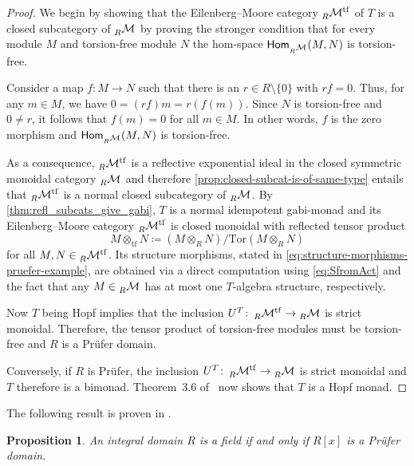 \documentclass[12pt,dvipsnames,oneside]{amsart}
\theoremstyle{plain}
\newtheorem{proposition}{Proposition}[section]
\theoremstyle{remark}
\theoremstyle{definition}
\newcommand*{\from}{\colon}
\newcommand*{\eqdef}{\coloneqq}
\newcommand{\Tor}{\ensuremath{\mathrm{Tor}}}
\newcommand*{\Hom}{\mathsf{Hom}}
\newcommand{\U}{U}
\begin{document}
\begin{proof}
  We begin by showing that the Eilenberg--Moore category \(\hmodM[R][][ \mathrm{tf}]\) of \(T\) is a closed subcategory of \(\hmodM[R]\) by proving the stronger condition that for every module \(M\) and torsion-free module \(N\) the hom-space \(\Hom_{\hmodM[R]}(M,N)\) is torsion-free.

  Consider a  map \(f\from M \to N\) such that there is an \(r\in R\setminus\{0\}\) with \(rf=0\).
  Thus, for any \(m\in M\), we have \(0 = (rf)m = r(f(m))\).
  Since \( N\) is torsion-free and \(0\neq r\), it follows that  \(f(m) = 0\) for all \(m\in M\).
  In other words, \(f\) is the zero morphism and \(\Hom_{\hmodM[R]}(M,N)\) is torsion-free.

  As a consequence, \(\hmodM[R][][\mathrm{tf}]\) is a reflective exponential ideal in the closed symmetric monoidal category \(\hmodM[R]\) and therefore \cref{prop:closed-subcat-is-of-same-type} entails that \(\hmodM[R][][\mathrm{tf}]\) is a normal closed subcategory of \(\hmodM[R]\).
  By \cref{thm:refl_subcats_give_gabi}, \(T\) is a normal idempotent gabi-monad and its Eilenberg--Moore category \(\hmodM[R][][ \mathrm{tf}]\) is closed monoidal with reflected tensor product
  \begin{equation*}
    M\otimes_{\mathrm{tf}} N \eqdef (M\otimes_{R}N)/\Tor(M\otimes_{R}N)
  \end{equation*}
  for all \(M,N \in \hmodM[R][][ \mathrm{tf}]\).
  Its structure morphisms, stated in \eqref{eq:structure-morphisms-pruefer-example}, are obtained via a direct computation using \eqref{eq:SfromAct} and the fact that any \(M\in \hmodM[R]\) has at most one \(T\)-algebra structure, respectively.

  Now \(T\) being Hopf implies that the inclusion \(\U^{T}\from \hmodM[R][][ \mathrm{tf}] \to \hmodM[R]\) is strict monoidal.
  Therefore, the tensor product of torsion-free modules must be torsion-free and \(R\) is a Pr\"ufer domain.

  Conversely, if \(R\) is Pr\"ufer, the inclusion \(\U^{T}\from \hmodM[R][][ \mathrm{tf}] \to \hmodM[R]\) is strict monoidal and \(T\) therefore is a bimonad.
  Theorem~3.6 of~\cite{BruguieresLackVirelizier} now shows that \(T\) is a Hopf monad.
\end{proof}

The following result is proven in \cite[Theorem~2.6]{brewer06:multip}.
\begin{proposition}\label{rmk:integral-not-pruefer}
  An integral domain \(R\) is a field if and only if \(R[x]\) is a Prüfer domain.
\end{proposition}
\end{document}
